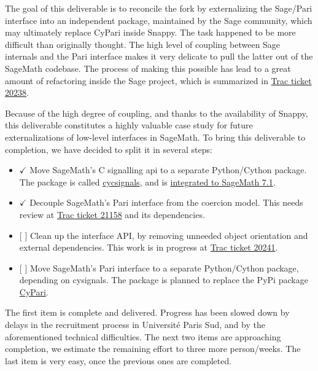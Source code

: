 The goal of this deliverable is to reconcile the fork by externalizing
the Sage/Pari interface into an independent package, maintained by the
Sage community, which may ultimately replace CyPari inside Snappy. The
task happened to be more difficult than originally thought. The high
level of coupling between Sage internals and the Pari interface makes it
very delicate to pull the latter out of the SageMath codebase. The
process of making this possible has lead to a great amount of
refactoring inside the Sage project, which is summarized in
\href{http://trac.sagemath.org/ticket/20238}{Trac ticket 20238}.

Because of the high degree of coupling, and thanks to the availability
of Snappy, this deliverable constitutes a highly valuable case study for
future externalizations of low-level interfaces in SageMath. To bring
this deliverable to completion, we have decided to split it in several
steps:

\begin{itemize}
\tightlist
\item
  \(\checkmark\) Move SageMath's C signalling api to a separate
  Python/Cython package. The package is called
  \href{https://github.com/sagemath/cysignals}{cycsignals}, and is
  \href{http://trac.sagemath.org/ticket/20002}{integrated to SageMath
  7.1}.
\item
  \(\checkmark\) Decouple SageMath's Pari interface from the coercion
  model. This needs review at
  \href{http://trac.sagemath.org/ticket/21158}{Trac ticket 21158} and
  its dependencies.
\item
  {[} {]} Clean up the interface API, by removing unneeded object
  orientation and external dependencies. This work is in progress at
  \href{http://trac.sagemath.org/ticket/20241}{Trac ticket 20241}.
\item
  {[} {]} Move SageMath's Pari interface to a separate Python/Cython
  package, depending on cysignals. The package is planned to replace the
  PyPi package \href{https://pypi.python.org/pypi/cypari/}{CyPari}.
\end{itemize}

The first item is complete and delivered. Progress has been slowed down
by delays in the recruitment process in Université Paris Sud, and by the
aforementioned technical difficulties. The next two items are
approaching completion, we estimate the remaining effort to three more
person/weeks. The last item is very easy, once the previous ones are
completed.
